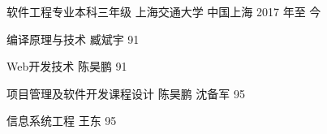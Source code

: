 

\begin{cventries}


  \cventry
    {软件工程专业本科三年级} %
    {上海交通大学} %
    {中国上海} %
    {2017 年至 今} %
    {
      \begin{cvitems} %
        \item 编译原理与技术 臧斌宇 91
        \item Web开发技术 陈昊鹏 91
        \item 项目管理及软件开发课程设计 陈昊鹏 沈备军 95
        \item 信息系统工程 王东 95
      \end{cvitems}
    }
\end{cventries}
